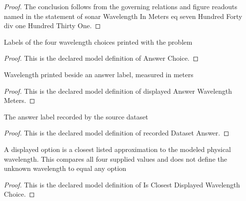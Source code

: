 \begin{proof}
  The conclusion follows from the governing relations and figure readouts named in the statement of sonar Wavelength In Meters eq seven Hundred Forty div one Hundred Thirty One.
\end{proof}
\begin{definition}
  \label{def:physics:phyx-mini-0190:phyxminiproblems-problemphyxmini0190-answerchoice}
  Labels of the four wavelength choices printed with the problem
\end{definition}
\begin{proof}
  This is the declared model definition of Answer Choice.
\end{proof}
\begin{definition}
  \label{def:physics:phyx-mini-0190:phyxminiproblems-problemphyxmini0190-displayedanswerwavelengthmeters}
  Wavelength printed beside an answer label, measured in meters
\end{definition}
\begin{proof}
  This is the declared model definition of displayed Answer Wavelength Meters.
\end{proof}
\begin{definition}
  \label{def:physics:phyx-mini-0190:phyxminiproblems-problemphyxmini0190-recordeddatasetanswer}
  The answer label recorded by the source dataset
\end{definition}
\begin{proof}
  This is the declared model definition of recorded Dataset Answer.
\end{proof}
\begin{definition}
  \label{def:physics:phyx-mini-0190:phyxminiproblems-problemphyxmini0190-isclosestdisplayedwavelengthchoice}
  A displayed option is a closest listed approximation to the modeled physical wavelength. This compares all four supplied values and does not define the unknown wavelength to equal any option
\end{definition}
\begin{proof}
  This is the declared model definition of Is Closest Displayed Wavelength Choice.
\end{proof}
